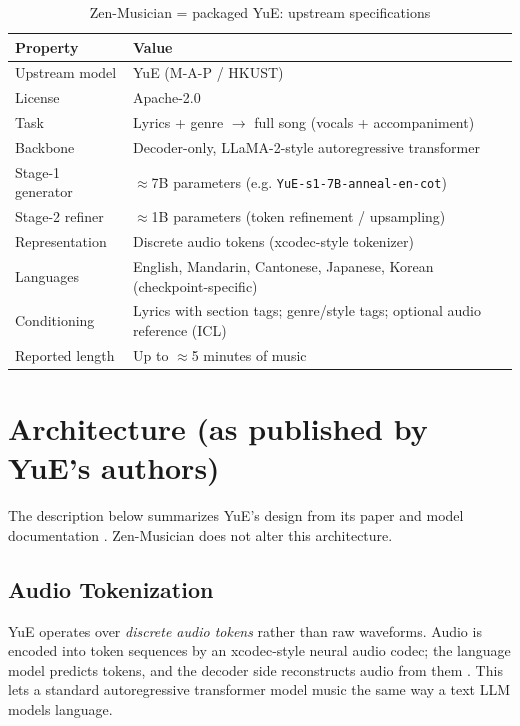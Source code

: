 \documentclass[11pt,a4paper]{article}
\begin{document}
\begin{table}[H]
\centering
\begin{tabular}{ll}
\toprule
\textbf{Property} & \textbf{Value} \\
\midrule
Upstream model & YuE (M-A-P / HKUST) \\
License & Apache-2.0 \cite{yuehf} \\
Task & Lyrics + genre $\rightarrow$ full song (vocals + accompaniment) \\
Backbone & Decoder-only, LLaMA-2-style autoregressive transformer \cite{yuan2025yue,touvron2023llama2} \\
Stage-1 generator & $\approx$7B parameters (e.g. \texttt{YuE-s1-7B-anneal-en-cot}) \\
Stage-2 refiner & $\approx$1B parameters (token refinement / upsampling) \\
Representation & Discrete audio tokens (xcodec-style tokenizer) \\
Languages & English, Mandarin, Cantonese, Japanese, Korean (checkpoint-specific) \\
Conditioning & Lyrics with section tags; genre/style tags; optional audio reference (ICL) \\
Reported length & Up to $\approx$5 minutes of music \cite{yuan2025yue} \\
\bottomrule
\end{tabular}
\caption{Zen-Musician = packaged YuE: upstream specifications}
\end{table}

\section{Architecture (as published by YuE's authors)}

The description below summarizes YuE's design from its paper and model
documentation \cite{yuan2025yue,yuehf,yuegh}. Zen-Musician does not alter this
architecture.

\subsection{Audio Tokenization}

YuE operates over \emph{discrete audio tokens} rather than raw waveforms. Audio is
encoded into token sequences by an xcodec-style neural audio codec; the language
model predicts tokens, and the decoder side reconstructs audio from them
\cite{yuehf}. This lets a standard autoregressive transformer model music the same
way a text LLM models language.
\end{document}
